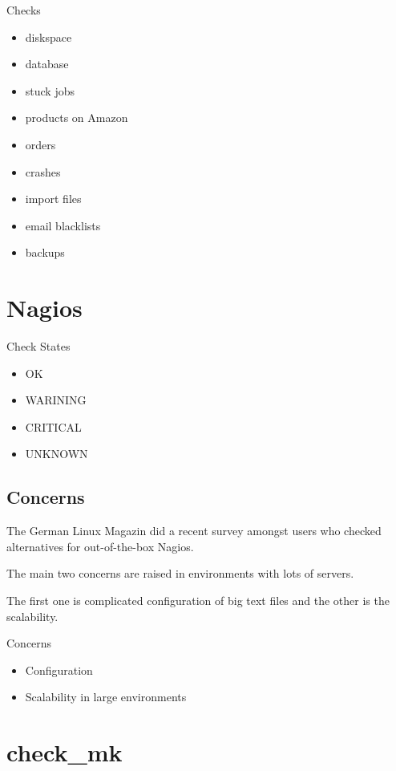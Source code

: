 \begin{frame}[fragile]{Checks}
\begin{itemize}
\item diskspace
\item database
\item stuck jobs
\item products on Amazon
\item orders
\item crashes
\item import files
\item email blacklists
\item backups
\end{itemize}
\end{frame}

\section{Nagios}

\begin{frame}[fragile]{Check States}
\begin{itemize}
\item OK
\item WARINING 
\item CRITICAL
\item UNKNOWN
\end{itemize}
\end{frame}

\subsection{Concerns}

The German Linux Magazin did a recent survey amongst users
who checked alternatives for out-of-the-box Nagios.

The main two concerns are raised in environments with lots
of servers.

The first one is complicated configuration of big text files
and the other is the scalability.

\begin{frame}{Concerns}

\begin{itemize}
\item Configuration
\item Scalability in large environments
\end{itemize}
\end{frame}

\section{check\_mk}

